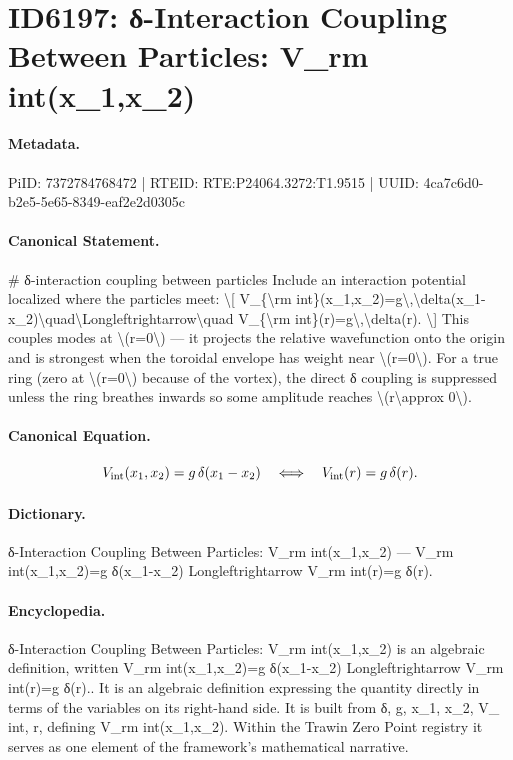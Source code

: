 \section*{ID6197: δ-Interaction Coupling Between Particles: V\_rm int(x\_1,x\_2)}
\paragraph{Metadata.}
PiID: 7372784768472 | RTEID: RTE:P24064.3272:T1.9515 | UUID: 4ca7c6d0-b2e5-5e65-8349-eaf2e2d0305c

\paragraph{Canonical Statement.}
\# δ-interaction coupling between particles Include an interaction potential localized where the particles meet: \textbackslash{}[ V\_\{\textbackslash{}rm int\}(x\_1,x\_2)=g\textbackslash{},\textbackslash{}delta(x\_1-x\_2)\textbackslash{}quad\textbackslash{}Longleftrightarrow\textbackslash{}quad V\_\{\textbackslash{}rm int\}(r)=g\textbackslash{},\textbackslash{}delta(r). \textbackslash{}] This couples modes at \textbackslash{}(r=0\textbackslash{}) — it projects the relative wavefunction onto the origin and is strongest when the toroidal envelope has weight near \textbackslash{}(r=0\textbackslash{}). For a true ring (zero at \textbackslash{}(r=0\textbackslash{}) because of the vortex), the direct δ coupling is suppressed unless the ring breathes inwards so some amplitude reaches \textbackslash{}(r\textbackslash{}approx 0\textbackslash{}).

\paragraph{Canonical Equation.}
\[
V_{\rm int}(x_1,x_2)=g\,\delta(x_1-x_2)\quad\Longleftrightarrow\quad V_{\rm int}(r)=g\,\delta(r).
\]

\paragraph{Dictionary.}
δ-Interaction Coupling Between Particles: V\_rm int(x\_1,x\_2) — V\_rm int(x\_1,x\_2)=g δ(x\_1-x\_2) Longleftrightarrow V\_rm int(r)=g δ(r).

\paragraph{Encyclopedia.}
δ-Interaction Coupling Between Particles: V\_rm int(x\_1,x\_2) is an algebraic definition, written V\_rm int(x\_1,x\_2)=g δ(x\_1-x\_2) Longleftrightarrow V\_rm int(r)=g δ(r).. It is an algebraic definition expressing the quantity directly in terms of the variables on its right-hand side. It is built from δ, g, x\_1, x\_2, V\_ int, r, defining V\_rm int(x\_1,x\_2). Within the Trawin Zero Point registry it serves as one element of the framework's mathematical narrative.
